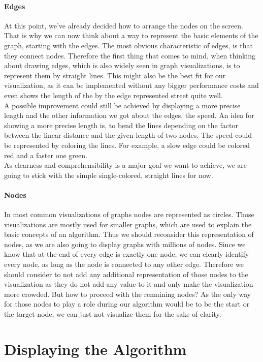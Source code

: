 \documentclass
[
	paper = a4,
    pagesize,
	12 pt,
	oneside,                       %
    open = right,
	DIV = calc,
	BCOR = 0 mm,                   %
	bibtotoc
]
{scrbook}
\begin{document}
\paragraph{Edges}
At this point, we've already decided how to arrange the nodes on the screen.
That is why we can now think about a way to represent the basic elements of the graph, starting with the edges.
The most obvious characteristic of edges, is that they connect nodes.
Therefore the first thing that comes to mind, when thinking about drawing edges, which is also widely seen in graph visualizations, is to represent them by straight lines.
This might also be the best fit for our visualization, as it can be implemented without any bigger performance costs and even shows the length of the by the edge represented street quite well.\\
A possible improvement could still be achieved by displaying a more precise length and the other information we got about the edges, the speed.
An idea for showing a more precise length is, to bend the lines depending on the factor between the linear distance and the given length of two nodes.
The speed could be represented by coloring the lines.
For example, a slow edge could be colored red and a faster one green.\\
As clearness and comprehensibility is a major goal we want to achieve, we are going to stick with the simple single-colored, straight lines for now.


\paragraph{Nodes}
In most common visualizations of graphs nodes are represented as circles.
Those visualizations are mostly used for smaller graphs, which are used to explain the basic concepts of an algorithm.
Thus we should reconsider this representation of nodes, as we are also going to display graphs with millions of nodes.
Since we know that at the end of every edge is exactly one node, we can clearly identify every node, as long as the node is connected to any other edge.
Therefore we should consider to not add any additional representation of those nodes to the visualization as they do not add any value to it and only make the visualization more crowded.
But how to proceed with the remaining nodes?
As the only way for those nodes to play a role during our algorithm would be to be the start or the target node, we can just not visualize them for the sake of clarity.


\section{Displaying the Algorithm}
\end{document}
